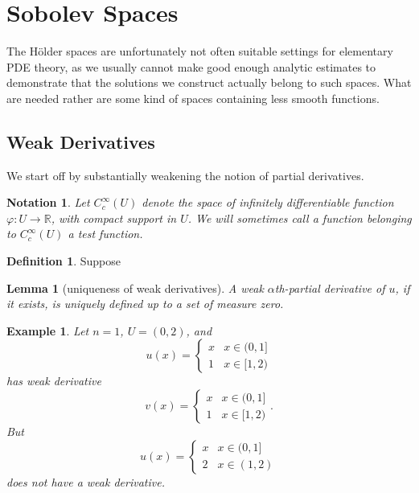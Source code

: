 \documentclass{article}
\newtheorem{notation}{Notation}
\newtheorem{lemma}{Lemma}[section]
\newtheorem{example}{Example}[section]
\theoremstyle{definition}
\newtheorem{definition}{Definition}[section]
\begin{document}
\section{Sobolev Spaces}
The H\"older spaces are unfortunately not often suitable settings for elementary PDE theory,
as we usually cannot make good enough analytic estimates to demonstrate that the solutions we construct actually belong to such spaces.
What are needed rather are some kind of spaces containing less smooth functions.

\subsection{Weak Derivatives}
We start off by substantially weakening the notion of partial derivatives.
\begin{notation}
Let $C_c^\infty(U)$ denote the space of infinitely differentiable function $\varphi:U\to\mathbb{R}$, with compact support in $U$.
We will sometimes call a function belonging to $C_c^\infty(U)$ a test function.
\end{notation}

\begin{definition}
    Suppose 
\end{definition}

\begin{lemma}[uniqueness of weak derivatives]
    A weak $\alpha$th-partial derivative of $u$, if it exists, is uniquely defined up to a set of measure zero.
\end{lemma}

\begin{example}
    Let $n=1$, $U=(0,2)$, and 
    \[ u(x)=\left\{\begin{matrix}
        x  & x\in(0,1]\\
        1  & x\in[1,2)
        \end{matrix}\right.\] 
    has weak derivative 
        \[
            v(x)=\left\{\begin{matrix}
            x  & x\in(0,1]\\
            1  & x\in[1,2)
            \end{matrix}\right..\] 
    But \[ u(x)=\left\{\begin{matrix}
        x  & x\in(0,1]\\
        2  & x\in(1,2)
        \end{matrix}\right.\] 
    does not have a weak derivative.
        
\end{example}
\end{document}
